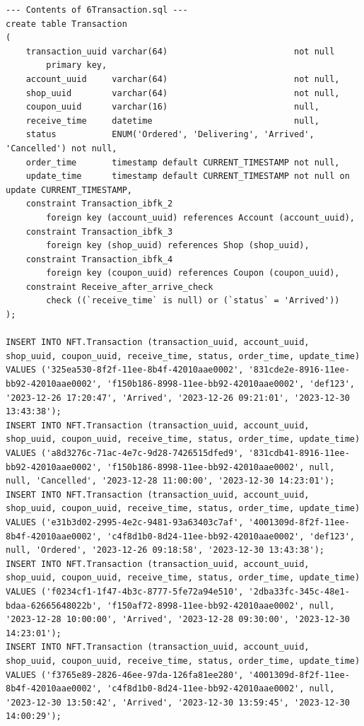 \documentclass[a4paper, 12pt]{article}
\begin{document}
\begin{lstlisting}
--- Contents of 6Transaction.sql ---
create table Transaction
(
    transaction_uuid varchar(64)                         not null
        primary key,
    account_uuid     varchar(64)                         not null,
    shop_uuid        varchar(64)                         not null,
    coupon_uuid      varchar(16)                         null,
    receive_time     datetime                            null,
    status           ENUM('Ordered', 'Delivering', 'Arrived', 'Cancelled') not null,
    order_time       timestamp default CURRENT_TIMESTAMP not null,
    update_time      timestamp default CURRENT_TIMESTAMP not null on update CURRENT_TIMESTAMP,
    constraint Transaction_ibfk_2
        foreign key (account_uuid) references Account (account_uuid),
    constraint Transaction_ibfk_3
        foreign key (shop_uuid) references Shop (shop_uuid),
    constraint Transaction_ibfk_4
        foreign key (coupon_uuid) references Coupon (coupon_uuid),
    constraint Receive_after_arrive_check
        check ((`receive_time` is null) or (`status` = 'Arrived'))
);

INSERT INTO NFT.Transaction (transaction_uuid, account_uuid, shop_uuid, coupon_uuid, receive_time, status, order_time, update_time) VALUES ('325ea530-8f2f-11ee-8b4f-42010aae0002', '831cde2e-8916-11ee-bb92-42010aae0002', 'f150b186-8998-11ee-bb92-42010aae0002', 'def123', '2023-12-26 17:20:47', 'Arrived', '2023-12-26 09:21:01', '2023-12-30 13:43:38');
INSERT INTO NFT.Transaction (transaction_uuid, account_uuid, shop_uuid, coupon_uuid, receive_time, status, order_time, update_time) VALUES ('a8d3276c-71ac-4e7c-9d28-7426515dfed9', '831cdb41-8916-11ee-bb92-42010aae0002', 'f150b186-8998-11ee-bb92-42010aae0002', null, null, 'Cancelled', '2023-12-28 11:00:00', '2023-12-30 14:23:01');
INSERT INTO NFT.Transaction (transaction_uuid, account_uuid, shop_uuid, coupon_uuid, receive_time, status, order_time, update_time) VALUES ('e31b3d02-2995-4e2c-9481-93a63403c7af', '4001309d-8f2f-11ee-8b4f-42010aae0002', 'c4f8d1b0-8d24-11ee-bb92-42010aae0002', 'def123', null, 'Ordered', '2023-12-26 09:18:58', '2023-12-30 13:43:38');
INSERT INTO NFT.Transaction (transaction_uuid, account_uuid, shop_uuid, coupon_uuid, receive_time, status, order_time, update_time) VALUES ('f0234cf1-1f47-4b3c-8777-5fe72a94e510', '2dba33fc-345c-48e1-bdaa-62665648022b', 'f150af72-8998-11ee-bb92-42010aae0002', null, '2023-12-28 10:00:00', 'Arrived', '2023-12-28 09:30:00', '2023-12-30 14:23:01');
INSERT INTO NFT.Transaction (transaction_uuid, account_uuid, shop_uuid, coupon_uuid, receive_time, status, order_time, update_time) VALUES ('f3765e89-2826-46ee-97da-126fa81ee280', '4001309d-8f2f-11ee-8b4f-42010aae0002', 'c4f8d1b0-8d24-11ee-bb92-42010aae0002', null, '2023-12-30 13:50:42', 'Arrived', '2023-12-30 13:59:45', '2023-12-30 14:00:29');



\end{lstlisting}
\end{document}
